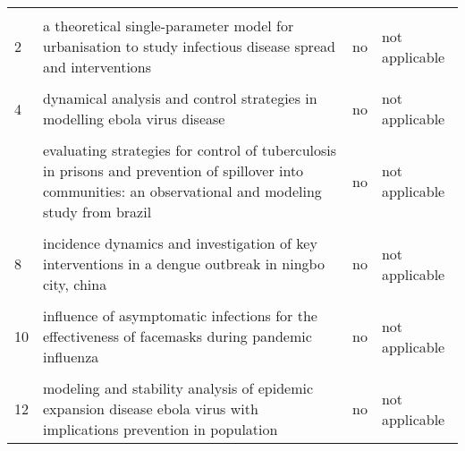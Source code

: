 \documentclass[
]{article}
\begin{document}
\begin{landscape}
\begin{longtable}{l>{\raggedright\arraybackslash}p{4cm}l>{\raggedright\arraybackslash}p{4cm}}
\endfoot
\bottomrule
\endlastfoot
\cellcolor{gray!6}{1} & \cellcolor{gray!6}{a cholera metapopulation model interlinking migration with intervention strategies - a case study of zimbabwe (2008-2009)} & \cellcolor{gray!6}{no} & \cellcolor{gray!6}{not applicable}\\
2 & a theoretical single-parameter model for urbanisation to study infectious disease spread and interventions & no & not applicable\\
\cellcolor{gray!6}{3} & \cellcolor{gray!6}{assessing the effects of modeling the spectrum of clinical symptoms on the dynamics and control of ebola} & \cellcolor{gray!6}{no} & \cellcolor{gray!6}{not applicable}\\
4 & dynamical analysis and control strategies in modelling ebola virus disease & no & not applicable\\
\cellcolor{gray!6}{5} & \cellcolor{gray!6}{effect of a hepatitis a vaccination campaign during a hepatitis a outbreak in taiwan, 2015–2017: a modeling study} & \cellcolor{gray!6}{no} & \cellcolor{gray!6}{not applicable}\\
\addlinespace
6 & evaluating strategies for control of tuberculosis in prisons and prevention of spillover into communities: an observational and modeling study from brazil & no & not applicable\\
\cellcolor{gray!6}{7} & \cellcolor{gray!6}{evaluating the effects of control interventions and estimating the inapparent infections for dengue outbreak in hangzhou, china} & \cellcolor{gray!6}{no} & \cellcolor{gray!6}{not applicable}\\
8 & incidence dynamics and investigation of key interventions in a dengue outbreak in ningbo city, china & no & not applicable\\
\cellcolor{gray!6}{9} & \cellcolor{gray!6}{incorporating media data into a model of infectious disease transmission} & \cellcolor{gray!6}{no} & \cellcolor{gray!6}{not applicable}\\
10 & influence of asymptomatic infections for the effectiveness of facemasks during pandemic influenza & no & not applicable\\
\addlinespace
\cellcolor{gray!6}{11} & \cellcolor{gray!6}{mathematical analysis of a cholera infection model with vaccination strategy} & \cellcolor{gray!6}{no} & \cellcolor{gray!6}{not applicable}\\
12 & modeling and stability analysis of epidemic expansion disease ebola virus with implications prevention in population & no & not applicable\\

\end{longtable}
\end{landscape}
\end{document}
